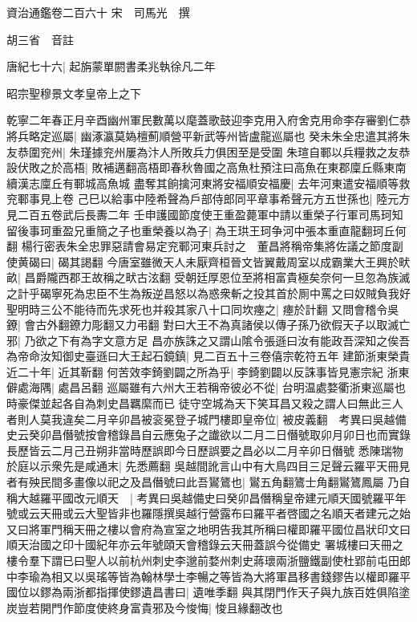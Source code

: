資治通鑑卷二百六十
宋　司馬光　撰

胡三省　音註

唐紀七十六|{
	起旃蒙單閼書柔兆執徐凡二年}


昭宗聖穆景文孝皇帝上之下

乾寧二年春正月辛酉幽州軍民數萬以麾蓋歌鼓迎李克用入府舍克用命李存審劉仁恭將兵略定巡屬|{
	幽涿瀛莫媯檀薊順營平新武等州皆盧龍巡屬也}
癸未朱全忠遣其將朱友恭圍兖州|{
	朱瑾據兖州屢為汴人所敗兵力俱困至是受圍}
朱瑄自鄆以兵糧救之友恭設伏敗之於高梧|{
	敗補邁翻高梧即春秋魯國之高魚杜預注曰高魚在東郡廩丘縣東南續漢志廩丘有鄆城高魚城}
盡奪其餉擒河東將安福順安福慶|{
	去年河東遣安福順等救兖鄆事見上卷}
己巳以給事中陸希聲為戶部侍郎同平章事希聲元方五世孫也|{
	陸元方見二百五卷武后長夀二年}
壬申護國節度使王重盈薨軍中請以重榮子行軍司馬珂知留後事珂重盈兄重簡之子也重榮養以為子|{
	為王珙王珂争河中張本重直龍翻珂丘何翻}
楊行密表朱全忠罪惡請會易定兖鄆河東兵討之　董昌將稱帝集將佐議之節度副使黄碣曰|{
	碣其謁翻}
今唐室雖微天人未厭齊桓晉文皆翼戴周室以成霸業大王興於畎畝|{
	昌爵隴西郡王故稱之畎古泫翻}
受朝廷厚恩位至將相富貴極矣奈何一旦忽為族滅之計乎碣寧死為忠臣不生為叛逆昌怒以為惑衆斬之投其首於厠中罵之曰奴賊負我好聖明時三公不能待而先求死也并殺其家八十口同坎瘞之|{
	瘞於計翻}
又問會稽令吳鐐|{
	會古外翻鐐力彫翻又力弔翻}
對曰大王不為真諸侯以傳子孫乃欲假天子以取滅亡邪|{
	乃欲之下有為字文意方足}
昌亦族誅之又謂山隂令張遜曰汝有能政吾深知之俟吾為帝命汝知御史臺遜曰大王起石鏡鎮|{
	見二百五十三卷僖宗乾符五年}
建節浙東榮貴近二十年|{
	近其靳翻}
何苦效李錡劉闢之所為乎|{
	李錡劉闢以反誅事皆見憲宗紀}
浙東僻處海隅|{
	處昌呂翻}
巡屬雖有六州大王若稱帝彼必不從|{
	台明温處婺衢浙東巡屬也時豪傑並起各自為刺史昌羈縻而已}
徒守空城為天下笑耳昌又殺之謂人曰無此三人者則人莫我違矣二月辛卯昌被衮冕登子城門樓即皇帝位|{
	被皮義翻　考異曰吳越備史云癸卯昌僭號按會稽錄昌自云應兔子之䜟欲以二月二日僭號取卯月卯日也而實錄長歷皆云二月己丑朔非當時歷誤即今日歷誤要之昌必以二月辛卯日僭號}
悉陳瑞物於庭以示衆先是咸通末|{
	先悉薦翻}
吳越間訛言山中有大鳥四目三足聲云羅平天冊見者有殃民間多畫像以祀之及昌僭號曰此吾鸑鷟也|{
	鸑五角翻鷟士角翻鸑鷟鳳屬}
乃自稱大越羅平國改元順天　|{
	考異曰吳越備史曰癸卯昌僭稱皇帝建元順天國號羅平年號或云天冊或云大聖皆非也羅隱撰吳越行營露布曰羅平者啓國之名順天者建元之始又曰將軍門稱天冊之樓以會府為宣室之地明告我其所稱曰權即羅平國位昌狀印文曰順天治國之印十國紀年亦云年號頤天會稽錄云天冊蓋誤今從備史}
署城樓曰天冊之樓令羣下謂已曰聖人以前杭州刺史李邈前婺州刺史蔣瓌兩浙鹽鐵副使杜郢前屯田郎中李瑜為相又以吳瑤等皆為翰林學士李暢之等皆為大將軍昌移書錢鏐告以權即羅平國位以鏐為兩浙都指揮使鏐遺昌書曰|{
	遺唯季翻}
與其閉門作天子與九族百姓俱陷塗炭豈若開門作節度使終身富貴邪及今悛悔|{
	悛且緣翻改也}
